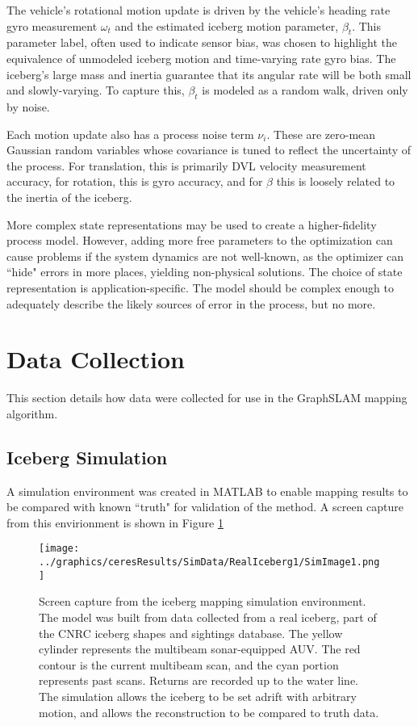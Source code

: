 The vehicle's rotational motion update is driven by the vehicle's heading rate gyro measurement $\omega_t$ and the estimated iceberg motion parameter, $\beta_t$. This parameter label, often used to indicate sensor bias, was chosen to highlight the equivalence of unmodeled iceberg motion and time-varying rate gyro bias. The iceberg's large mass and inertia guarantee that its angular rate will be both small and slowly-varying. To capture this, $\beta_t$ is modeled as a random walk, driven only by noise.

Each motion update also has a process noise term $\nu_i$. These are zero-mean Gaussian random variables whose covariance is tuned to reflect the uncertainty of the process. For translation, this is primarily DVL velocity measurement accuracy, for rotation, this is gyro accuracy, and for $\beta$ this is loosely related to the inertia of the iceberg. 

More complex state representations may be used to create a higher-fidelity process model. However, adding more free parameters to the optimization can cause problems if the system dynamics are not well-known, as the optimizer can ``hide" errors in more places, yielding non-physical solutions. The choice of state representation is application-specific. The model should be complex enough to adequately describe the likely sources of error in the process, but no more.

\section{Data Collection}

This section details how data were collected for use in the GraphSLAM mapping algorithm.

\subsection{Iceberg Simulation}

A simulation environment was created in MATLAB to enable mapping results to be compared with known ``truth" for validation of the method. A screen capture from this envirionment is shown in Figure \ref{fig:IcebergSim}
 
 \begin{figure}[htbp]
   \centering
   \texttt{[image: ../graphics/ceresResults/SimData/RealIceberg1/SimImage1.png]} %
   \caption{Screen capture from the iceberg mapping simulation environment. The model was built from data collected from a real iceberg, part of the CNRC iceberg shapes and sightings database. The yellow cylinder represents the multibeam sonar-equipped AUV. The red contour is the current multibeam scan, and the cyan portion represents past scans. Returns are recorded up to the water line. The simulation allows the iceberg to be set adrift with arbitrary motion, and allows the reconstruction to be compared to truth data.}
   \label{fig:IcebergSim}
\end{figure}

